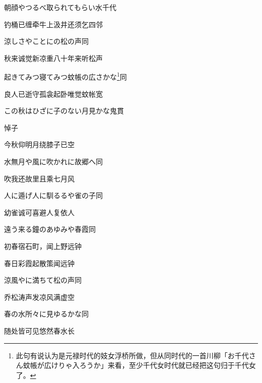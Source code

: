 \begin{haiku}
    {\FH 朝顔やつるべ取られてもらい水}\hfill{\FH 千代}

    {\FK 钓桶已缠牵牛上汲井还须乞四邻}
\end{haiku}

\begin{haiku}
    {\FH 涼しさやことにの松の声}\hfill{\FH 同}

    {\FK 秋来诚觉新凉重八十年来听松声}
\end{haiku}

\begin{haiku}
    {\FH 起きてみつ寝てみつ蚊帳の広さかな\footnote{\FT 此句有说认为是元禄时代的妓女浮桥所做，但从同时代的一首川柳「お千代さん蚊帳が広けりゃ入ろうか」来看，至少千代女时代就已经把这句归于千代女了。}}\hfill{\FH 同}

    {\FK 良人已逝守孤衾起卧唯觉蚊帐宽}
\end{haiku}

\begin{haiku}
    {\FH この秋はひざに子のない月見かな}\hfill{\FH 鬼貫}

    {\FK 悼子}

    {\FK 今秋仰明月绕膝子已空}
\end{haiku}

\begin{haiku}
    {\FH 水無月や風に吹かれに故郷へ}\hfill{\FH 同}

    {\FK 吹我还故里且乘七月风}
\end{haiku}

\begin{haiku}
    {\FH 人に遁げ人に馴るるや雀の子}\hfill{\FH 同}

    {\FK 幼雀诚可喜避人复依人}
\end{haiku}

\begin{haiku}
    {\FH 遠う来る鐘のあゆみや春霞}\hfill{\FH 同}

    {\FK 初春宿石町，闻上野远钟}

    {\FK 春日彩霞起散策闻远钟}
\end{haiku}

\begin{haiku}
    {\FH 涼風やに満ちて松の声}\hfill{\FH 同}

    {\FK 乔松涛声发凉风满虚空}
\end{haiku}

\begin{haiku}
    {\FH 春の水所々に見ゆるかな}\hfill{\FH 同}

    {\FK 随处皆可见悠然春水长}
\end{haiku}

